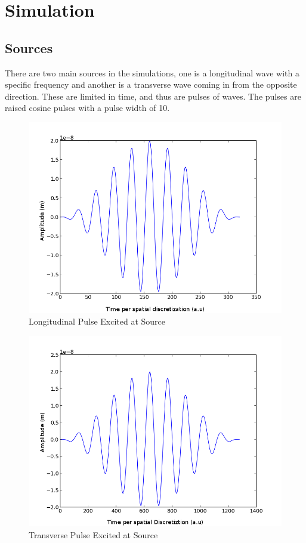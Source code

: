 \section{Simulation}
\subsection{Sources}
There are two main sources in the simulations, one is a longitudinal wave with a specific frequency and another is a transverse wave coming in from the opposite direction. These are limited in time, and thus are pulses of waves. The pulses are raised cosine pulses with a pulse width of 10. 
\begin{figure}
\includegraphics[scale=0.5]{images/chapter_3/wave_1.png}
\caption{Longitudinal Pulse Excited at Source}
\end{figure}
\begin{figure}
\includegraphics[scale=0.5]{images/chapter_3/wave_2.png}
\caption{Transverse Pulse Excited at Source}
\end{figure}
